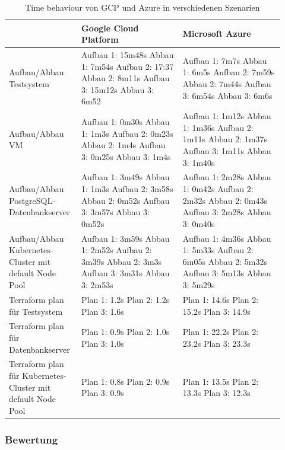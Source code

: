 \begin{spacing}{1.2}
\begin{table}[H]
  \centering
  \begin{tabular}{|p{0.22\linewidth}|p{0.35\linewidth}|p{0.35\linewidth}|}
    \hline
    & Google Cloud Platform & Microsoft Azure\\
    \hline
    Aufbau/Abbau Testsystem & 
    Aufbau 1: 15m48s Abbau 1: 7m54s
    Aufbau 2: 17:37 Abbau 2: 8m11s
    Aufbau 3: 15m12s Abbau 3: 6m52 &
    Aufbau 1: 7m7s Abbau 1: 6m5s
    Aufbau 2: 7m59s Abbau 2: 7m44s
    Aufbau 3: 6m54s Abbau 3: 6m6s \\
    \hline
    Aufbau/Abbau VM &
    Aufbau 1: 0m30s Abbau 1: 1m3s
    Aufbau 2: 0m23s Abbau 2: 1m4s
    Aufbau 3: 0m25s Abbau 3: 1m4s &
    Aufbau 1: 1m12s Abbau 1: 1m36s
    Aufbau 2: 1m11s Abbau 2: 1m37s
    Aufbau 3: 1m11s Abbau 3: 1m40s \\
    \hline
    Aufbau/Abbau PostgreSQL-Datenbankserver &
    Aufbau 1: 3m49s Abbau 1: 1m3s
    Aufbau 2: 3m58s Abbau 2: 0m52s
    Aufbau 3: 3m57s Abbau 3: 0m52s &
    Aufbau 1: 2m28s Abbau 1: 0m42s
    Aufbau 2: 2m32s Abbau 2: 0m43s
    Aufbau 3: 2m28s Abbau 3: 0m40s \\
    \hline
    Aufbau/Abbau Kubernetes-Cluster mit default Node Pool &
    Aufbau 1: 3m59s Abbau 1: 2m52s
    Aufbau 2: 3m39s Abbau 2: 3m3s
    Aufbau 3: 3m31s Abbau 3: 2m53s &
    Aufbau 1: 4m36s Abbau 1: 5m33s
    Aufbau 2: 6m05s Abbau 2: 5m32s
    Aufbau 3: 5m13s Abbau 3: 5m29s \\
    \hline
    Terraform plan für Testsystem &
    Plan 1: 1.2s
    Plan 2: 1.2s
    Plan 3: 1.6s &
    Plan 1: 14.6s
    Plan 2: 15.2s
    Plan 3: 14.9s \\
    \hline
    Terraform plan für Datenbankserver &
    Plan 1: 0.9s
    Plan 2: 1.0s
    Plan 3: 1.0s &
    Plan 1: 22.2s
    Plan 2: 23.2s
    Plan 3: 23.3s \\
    \hline
    Terraform plan für Kubernetes-Cluster mit default Node Pool &
    Plan 1: 0.8s
    Plan 2: 0.9s
    Plan 3: 0.9s &
    Plan 1: 13.5s
    Plan 2: 13.3s
    Plan 3: 12.3s \\
    \hline
  \end{tabular}
  \caption{Time behaviour von GCP und Azure in verschiedenen Szenarien}
\end{table}

\subsubsection{Bewertung}


\end{spacing}
